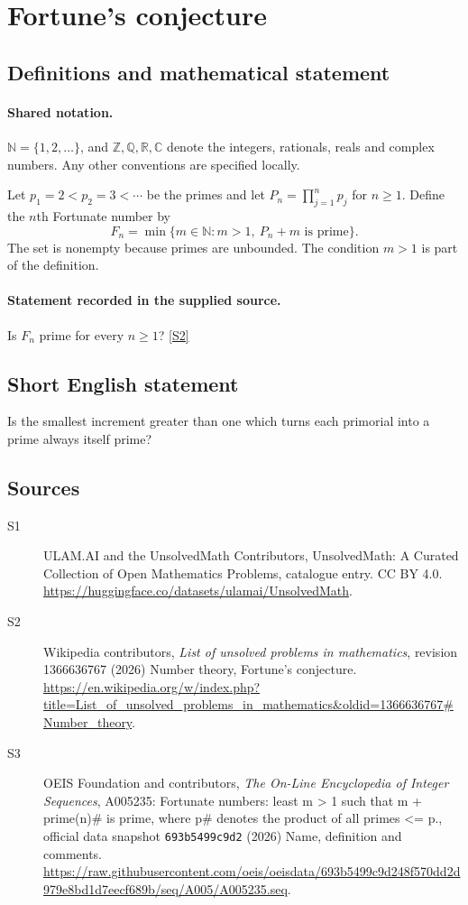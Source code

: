 \documentclass[11pt]{article}
\newcommand{\sref}[2]{\hyperlink{source:#1:#2}{[S#2]}}
\begin{document}
\section{Fortune's conjecture}\label{statement}

\subsection{Definitions and mathematical statement}

\paragraph{Shared notation.}$\mathbb N=\{1,2,\ldots\}$, and $\mathbb Z,\mathbb Q,\mathbb R,\mathbb C$ denote the integers, rationals, reals and complex numbers. Any other conventions are specified locally.


Let $p_1=2<p_2=3<\cdots$ be the primes and let $P_n=\prod_{j=1}^{n}p_j$ for $n\ge1$. Define the $n$th Fortunate number by
\[
F_n=\min\{m\in\mathbb N:m>1,\ P_n+m\text{ is prime}\}.
\]
The set is nonempty because primes are unbounded. The condition $m>1$ is part of the definition.
\paragraph{Statement recorded in the supplied source.}
Is $F_n$ prime for every $n\ge1$? \sref{statement}{2}
\subsection{Short English statement}
Is the smallest increment greater than one which turns each primorial into a prime always itself prime?
\subsection{Sources}
\begin{description}
\item[\hypertarget{source:statement:1}{S1}] ULAM.AI and the UnsolvedMath Contributors, UnsolvedMath: A Curated Collection of Open Mathematics Problems, catalogue entry. CC BY 4.0. \url{https://huggingface.co/datasets/ulamai/UnsolvedMath}.
\item[\hypertarget{source:statement:2}{S2}] Wikipedia contributors, \emph{List of unsolved problems in mathematics}, revision 1366636767 (2026) Number theory, Fortune's conjecture. \url{https://en.wikipedia.org/w/index.php?title=List_of_unsolved_problems_in_mathematics&oldid=1366636767#Number_theory}.
\item[\hypertarget{source:statement:3}{S3}] OEIS Foundation and contributors, \emph{The On-Line Encyclopedia of Integer Sequences}, A005235: Fortunate numbers: least m > 1 such that m + prime(n)\# is prime, where p\# denotes the product of all primes <= p., official data snapshot \texttt{693b5499c9d2} (2026) Name, definition and comments. \url{https://raw.githubusercontent.com/oeis/oeisdata/693b5499c9d248f570dd2d979e8bd1d7eecf689b/seq/A005/A005235.seq}.
\end{description}
\label{end:statement}
\end{document}
